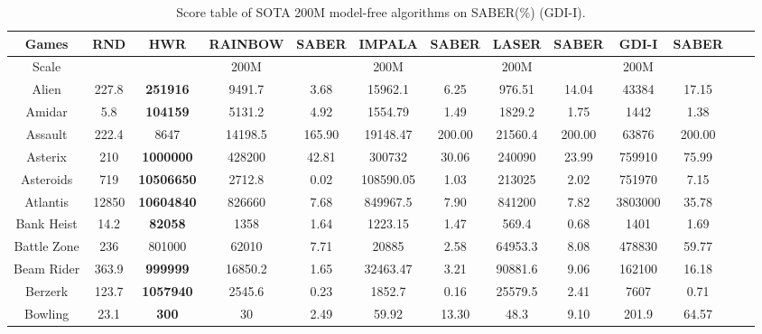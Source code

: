 \documentclass[nohyperref]{article}
\theoremstyle{plain}
\begin{document}
\begin{table}[!hb]
\footnotesize
\begin{center}
\caption{Score table of SOTA 200M model-free algorithms on SABER(\%)  (GDI-I).}
\setlength{\tabcolsep}{1.0pt}
\begin{tabular}{ |c |c |c| c c| c c|  c c |c c |c c |}
\hline
Games & RND & HWR & RAINBOW & SABER & IMPALA & SABER & LASER & SABER & GDI-I & SABER \\
\hline
Scale  &     &       & 200M   &       &  200M    &        & 200M   & &  200M   & \\
\hline
 Alien              & 227.8     & \textbf{251916}    & 9491.7   &3.68    & 15962.1    & 6.25       & 976.51  & 14.04     &43384      &17.15   \\
 Amidar             & 5.8       & \textbf{104159}    & 5131.2   &4.92    & 1554.79    & 1.49       & 1829.2  & 1.75      &1442              &1.38           \\
 Assault            & 222.4     & 8647               & 14198.5  &165.90  & 19148.47   & 200.00     & 21560.4 & 200.00    &63876      &200.00   \\
 Asterix            & 210       & \textbf{1000000}   & 428200   &42.81   & 300732     & 30.06      & 240090  & 23.99     &759910     &75.99   \\
 Asteroids          & 719       & \textbf{10506650}  & 2712.8   &0.02    & 108590.05  & 1.03       & 213025  & 2.02      &751970     &7.15    \\
 Atlantis           & 12850     & \textbf{10604840}  & 826660   &7.68    & 849967.5   & 7.90       & 841200  & 7.82      &3803000    &35.78   \\
 Bank Heist         & 14.2      & \textbf{82058}     & 1358     &1.64    & 1223.15    & 1.47       & 569.4   & 0.68      &1401       &1.69     \\
 Battle Zone        & 236       &801000    & 62010    &7.71    & 20885      & 2.58       & 64953.3 & 8.08      &478830     &59.77    \\
 Beam Rider         & 363.9     & \textbf{999999}    & 16850.2  &1.65    & 32463.47   & 3.21       & 90881.6 & 9.06      &162100     &16.18    \\
 Berzerk            & 123.7     & \textbf{1057940}            & 2545.6   &0.23    & 1852.7     & 0.16       & 25579.5 & 2.41      &7607              &0.71              \\
 Bowling            & 23.1      & \textbf{300}       & 30       &2.49    & 59.92      & 13.30      & 48.3    & 9.10      &201.9      &64.57  \\

\end{tabular}
\end{center}
\end{table}
\end{document}
